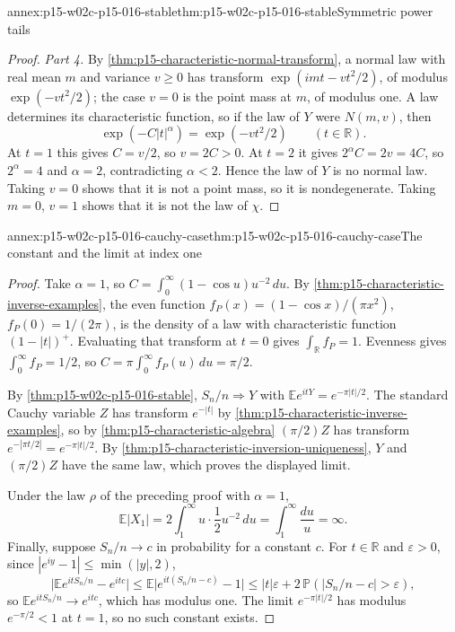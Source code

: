 \begin{annexitem}{annex:p15-w02c-p15-016-stable}{thm:p15-w02c-p15-016-stable}{Symmetric power tails}
\begin{proof}
\emph{Part 4.} By \cref{thm:p15-characteristic-normal-transform}, a
normal law with real mean \(m\) and variance \(v\geq0\) has transform
\(\exp(imt-vt^2/2)\), of modulus \(\exp(-vt^2/2)\); the case \(v=0\)
is the point mass at \(m\), of modulus one. A law determines its
characteristic function, so if the law of \(Y\) were \(N(m,v)\), then
\[
 \exp(-C|t|^\alpha)=\exp(-vt^2/2)\qquad(t\in\mathbb R).
\]
At \(t=1\) this gives \(C=v/2\), so \(v=2C>0\). At \(t=2\) it gives
\(2^\alpha C=2v=4C\), so \(2^\alpha=4\) and \(\alpha=2\), contradicting
\(\alpha<2\). Hence the law of \(Y\) is no normal law. Taking
\(v=0\) shows that it is not a point mass, so it is nondegenerate.
Taking \(m=0\), \(v=1\) shows that it is not the law of \(\chi\).
\end{proof}
\end{annexitem}

\begin{annexitem}{annex:p15-w02c-p15-016-cauchy-case}{thm:p15-w02c-p15-016-cauchy-case}{The constant and the limit at index one}
\begin{proof}
Take \(\alpha=1\), so \(C=\int_0^\infty(1-\cos u)u^{-2}\,du\). By
\cref{thm:p15-characteristic-inverse-examples}, the even function
\(f_P(x)=(1-\cos x)/(\pi x^2)\), \(f_P(0)=1/(2\pi)\), is the density of
a law with characteristic function \((1-|t|)^+\). Evaluating that
transform at \(t=0\) gives \(\int_{\mathbb R}f_P=1\). Evenness gives
\(\int_0^\infty f_P=1/2\), so
\(C=\pi\int_0^\infty f_P(u)\,du=\pi/2\).

By \cref{thm:p15-w02c-p15-016-stable},
\(S_n/n\Rightarrow Y\) with \(\mathbb Ee^{itY}=e^{-\pi|t|/2}\). The
standard Cauchy variable \(Z\) has transform \(e^{-|t|}\) by
\cref{thm:p15-characteristic-inverse-examples}, so by
\cref{thm:p15-characteristic-algebra} \((\pi/2)Z\) has transform
\(e^{-|\pi t/2|}=e^{-\pi|t|/2}\). By
\cref{thm:p15-characteristic-inversion-uniqueness}, \(Y\) and
\((\pi/2)Z\) have the same law, which proves the displayed limit.

Under the law \(\rho\) of the preceding proof with \(\alpha=1\),
\[
 \mathbb E|X_1|=2\int_1^\infty u\cdot\frac12u^{-2}\,du
 =\int_1^\infty\frac{du}u=\infty .
\]
Finally, suppose \(S_n/n\to c\) in probability for a constant \(c\).
For \(t\in\mathbb R\) and \(\varepsilon>0\), since
\(|e^{iy}-1|\leq\min(|y|,2)\),
\[
 \bigl|\mathbb Ee^{itS_n/n}-e^{itc}\bigr|
 \leq\mathbb E\bigl|e^{it(S_n/n-c)}-1\bigr|
 \leq|t|\varepsilon+2\,\mathbb P(|S_n/n-c|>\varepsilon),
\]
so \(\mathbb Ee^{itS_n/n}\to e^{itc}\), which has modulus one. The
limit \(e^{-\pi|t|/2}\) has modulus \(e^{-\pi/2}<1\) at \(t=1\), so no
such constant exists.
\end{proof}
\end{annexitem}
